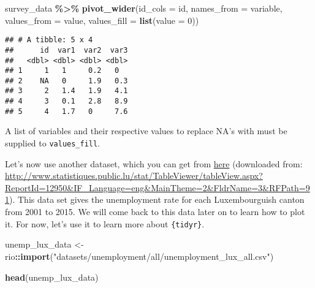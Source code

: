 \documentclass[
]{article}
\newenvironment{Shaded}{\begin{snugshade}}{\end{snugshade}}
\newcommand{\DataTypeTok}[1]{\textcolor[rgb]{0.13,0.29,0.53}{#1}}
\newcommand{\DecValTok}[1]{\textcolor[rgb]{0.00,0.00,0.81}{#1}}
\newcommand{\KeywordTok}[1]{\textcolor[rgb]{0.13,0.29,0.53}{\textbf{#1}}}
\newcommand{\NormalTok}[1]{#1}
\newcommand{\OperatorTok}[1]{\textcolor[rgb]{0.81,0.36,0.00}{\textbf{#1}}}
\newcommand{\StringTok}[1]{\textcolor[rgb]{0.31,0.60,0.02}{#1}}
\begin{document}
\begin{Shaded}
\begin{Highlighting}[]
\NormalTok{survey\_data }\OperatorTok{\%\textgreater{}\%}\StringTok{ }
\StringTok{  }\KeywordTok{pivot\_wider}\NormalTok{(}\DataTypeTok{id\_cols =}\NormalTok{ id, }\DataTypeTok{names\_from =}\NormalTok{ variable, }\DataTypeTok{values\_from =}\NormalTok{ value, }\DataTypeTok{values\_fill =} \KeywordTok{list}\NormalTok{(}\DataTypeTok{value =} \DecValTok{0}\NormalTok{))}
\end{Highlighting}
\end{Shaded}

\begin{verbatim}
## # A tibble: 5 x 4
##      id  var1  var2  var3
##   <dbl> <dbl> <dbl> <dbl>
## 1     1   1     0.2   0  
## 2    NA   0     1.9   0.3
## 3     2   1.4   1.9   4.1
## 4     3   0.1   2.8   8.9
## 5     4   1.7   0     7.6
\end{verbatim}

A list of variables and their respective values to replace NA's with must be supplied to \texttt{values\_fill}.

Let's now use another dataset, which you can get from
\href{https://github.com/b-rodrigues/modern_R/tree/master/datasets/unemployment/all}{here}
(downloaded from: \url{http://www.statistiques.public.lu/stat/TableViewer/tableView.aspx?ReportId=12950\&IF_Language=eng\&MainTheme=2\&FldrName=3\&RFPath=91}). This data set gives the unemployment rate for each Luxembourguish
canton from 2001 to 2015. We will come back to this data later on to learn how to plot it. For now,
let's use it to learn more about \texttt{\{tidyr\}}.

\begin{Shaded}
\begin{Highlighting}[]
\NormalTok{unemp\_lux\_data \textless{}{-}}\StringTok{ }\NormalTok{rio}\OperatorTok{::}\KeywordTok{import}\NormalTok{(}\StringTok{"datasets/unemployment/all/unemployment\_lux\_all.csv"}\NormalTok{)}

\KeywordTok{head}\NormalTok{(unemp\_lux\_data)}
\end{Highlighting}
\end{Shaded}
\end{document}
